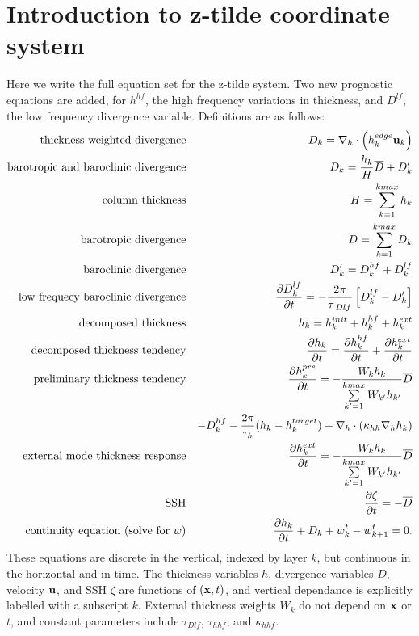 \documentclass[11pt]{report}
\newcommand{\bea}{\begin{eqnarray}}
\newcommand{\eea}{\end{eqnarray}}
\begin{document}
\section{Introduction to z-tilde coordinate system}

Here we write the full equation set for the z-tilde system.
Two new prognostic equations are added, for $h^{hf}$, the high frequency variations in thickness, and $D^{lf}$, the low frequency divergence variable.  Definitions are as follows: 
\bea
\mbox{thickness-weighted divergence} && D_k = \nabla_h \cdot  \left( h^{edge}_k {\bf u}_k \right)  \label{D1} \\
\mbox{barotropic and baroclinic divergence} && 
D_k = \frac{h_k}{H}{\overline D} + D_k' \label{D}\\
\mbox{column thickness} && H=\sum\limits_{k=1}^{kmax} h_{k} \label{H}\\
\mbox{barotropic divergence} && {\overline D} = \sum\limits_{k=1}^{kmax} D_k  \label{Dbtr}\\
\mbox{baroclinic divergence} &&  D_k'= D^{hf}_k + D^{lf}_k \label{Dbcl}\\
\mbox{low frequecy baroclinic divergence} && 
  \frac{\partial D^{lf}_k}{\partial t} = - \frac{2\pi}{\tau_{\;Dlf}} \left[ D^{lf}_k - D'_k \right] \label{Dlf}\\
\mbox{decomposed thickness} && h_k = h^{init}_k + h^{hf}_k + h^{ext}_k \label{h} \\
\mbox{decomposed thickness tendency} && 
  \frac{\partial h_k}{\partial t} = \frac{\partial h^{hf}_k}{\partial t} + \frac{\partial h^{ext}_k}{\partial t} 
   \label{dhdt} \\
\mbox{preliminary thickness tendency} && 
  \frac{\partial h^{pre}_k}{\partial t} = - \frac{W_k h_k}{\sum\limits_{k'=1}^{kmax} W_{k'} h_{k'}} {\overline D} 
\nonumber \\ &&
   - D^{hf}_k - \frac{2\pi}{\tau_{h}} (h_k - h^{target}_k)
   + \nabla_h\cdot \left( \kappa_{hh} \nabla_h h_k \right)
   \label{preliminary_thickness} \\
\mbox{external mode thickness response} && 
  \frac{\partial h^{ext}_k}{\partial t} = - \frac{W_k h_k}{\sum\limits_{k'=1}^{kmax} W_{k'} h_{k'}}
  {\overline D} 
   \label{hext} \\
\mbox{SSH} && 
  \frac{\partial \zeta}{\partial t}  = -{\overline D}
   \label{ssh} \\
\mbox{continuity equation (solve for $w$)} && 
\label{cont} 
\frac{\partial h_{k}}{\partial t} + D_k + w^t_k - w^t_{k+1} =0.
\eea
These equations are discrete in the vertical, indexed by layer $k$, but continuous in the horizontal and in time.  The thickness variables $h$, divergence variables $D$, velocity ${\bf u}$,  and SSH $\zeta$ are functions of $({\bf x},t)$, and vertical dependance is explicitly labelled with a subscript $k$.  External thickness weights $W_k$ do not depend on ${\bf x}$ or $t$, and constant parameters include 
$\tau_{Dlf}$, $\tau_{hhf}$, and $\kappa_{hhf}$.
\end{document}
